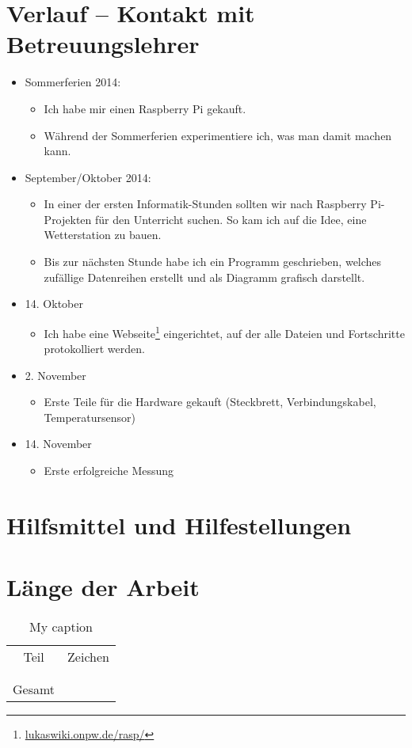 \documentclass[12pt,a4paper,oneside]{scrartcl}
\author{\myauthor}
\title{\mytitle}
\begin{document}
\maketitle

\section{Verlauf -- Kontakt mit Betreuungslehrer}

\begin{itemize}
	\item Sommerferien 2014:
	\begin{itemize}
		\item Ich habe mir einen Raspberry Pi gekauft.
		\item Während der Sommerferien experimentiere ich, was man damit machen kann.
	\end{itemize}
	\item September/Oktober 2014:
	\begin{itemize}
		\item In einer der ersten Informatik-Stunden sollten wir nach Raspberry Pi-Projekten für den Unterricht suchen. So kam ich auf die Idee, eine Wetterstation zu bauen.
		\item Bis zur nächsten Stunde habe ich ein Programm geschrieben, welches zufällige Datenreihen erstellt und als Diagramm grafisch darstellt.
	\end{itemize}
	\item 14. Oktober
	\begin{itemize}
		\item Ich habe eine Webseite\footnote{\href{http://lukaswiki.onpw.de/rasp/}{lukaswiki.onpw.de/rasp/}} eingerichtet, auf der alle Dateien und Fortschritte protokolliert werden.
	\end{itemize}
	\item 2. November
	\begin{itemize}
		\item Erste Teile für die Hardware gekauft (Steckbrett, Verbindungskabel, Temperatursensor)
	\end{itemize}
	\item 14. November
	\begin{itemize}
		\item Erste erfolgreiche Messung
	\end{itemize}

\end{itemize}
\section{Hilfsmittel und Hilfestellungen}
\lipsum[1]
\section{Länge der Arbeit}
\begin{table}[h]
	\centering
	\label{my-label}
	\begin{tabular}{c|c}
	Teil		&	Zeichen \\
		&	\\
		&	\\ \hline
	Gesamt	&  
	\end{tabular}
	\caption{My caption}
\end{table}
\end{document}
